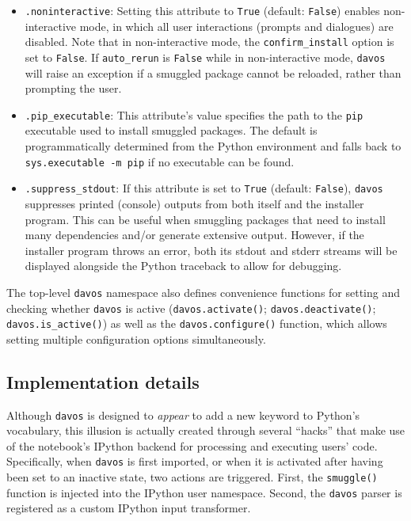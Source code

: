 \documentclass[preprint,12pt,a4paper]{elsarticle}
\begin{document}
\begin{itemize}
\item \texttt{.noninteractive}: Setting this attribute to
  \texttt{True} (default: \texttt{False}) enables non-in\-ter\-act\-ive
  mode, in which all user interactions (prompts and dialogues) are
  disabled. Note that in non-interactive mode, the
  \texttt{confirm\_install} option is set to \texttt{False}.  If
  \texttt{auto\_rerun} is \texttt{False} while in non-interactive
  mode, \texttt{davos} will raise an exception if a smuggled package
  cannot be reloaded, rather than prompting the user.

\item \texttt{.pip\_executable}: This attribute's value specifies the
  path to the \texttt{pip} executable used to install smuggled
  packages. The default is programmatically determined from the Python
  environment and falls back to \texttt{sys.executable -m pip} if no
  executable can be found.

\item \texttt{.suppress\_stdout}: If this attribute is set to
  \texttt{True} (default: \texttt{False}), \texttt{davos} suppresses
  printed (console) outputs from both itself and the installer program.
  This can be useful when smuggling packages that need to install many
  dependencies and/or generate extensive output. However, if the installer
  program throws an error, both its stdout and stderr streams will be
  displayed alongside the Python traceback to allow for debugging.
\end{itemize}

\noindent The top-level \texttt{davos} namespace also defines
convenience functions for setting and checking whether \texttt{davos}
is active (\texttt{davos.activate()}; \texttt{davos.deactivate()};
\texttt{davos.is\_active()}) as well as the \texttt{davos.configure()}
function, which allows setting multiple configuration options
simultaneously.

\subsection{Implementation details}\label{subsec:implementation}

Although \texttt{davos} is designed to \textit{appear} to add a new
keyword to Python's vocabulary, this illusion is actually created through
several ``hacks'' that make use of the notebook's IPython backend
for processing and executing users' code.  Specifically, when
\texttt{davos} is first imported, or when it is activated after having been
set to an inactive state, two actions are triggered.  First, the
\texttt{smuggle()} function is injected into the IPython user
namespace.  Second, the \texttt{davos} parser is registered as a
custom IPython input transformer.
\end{document}
